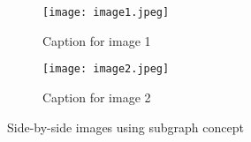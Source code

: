 \documentclass{article}
\begin{document}
	
	\begin{figure}[h]
		\centering
		\begin{subfigure}{0.46\linewidth}  %
			\texttt{[image: image1.jpeg]}  %
			\caption{Caption for image 1}  %
			\label{fig:subfig1}  %
		\end{subfigure}
		\hfill  %
		\begin{subfigure}{0.44\linewidth}  %
			\texttt{[image: image2.jpeg]}  %
			\caption{Caption for image 2}  %
			\label{fig:subfig2}  %
		\end{subfigure}
		\caption{Side-by-side images using subgraph concept}  %
		\label{fig:subfigures}  %
	\end{figure}
	
\end{document}
